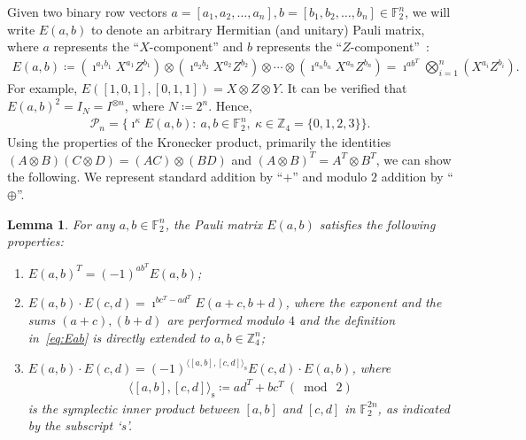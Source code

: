 \documentclass[journal,onecolumn]{IEEEtran}
\newtheorem{lemma}[theorem]{Lemma}
\newcommand{\syminn}[2]{\langle #1, #2 \rangle_{\text{s}}}
\newif\ifnotes
\newcommand{\bane}[1]{\ifnotes{{\color{dkgreen} [Bane: #1]}}\fi}
\begin{document}
Given two binary row vectors $a = [a_1,a_2,\ldots,a_n], b = [b_1,b_2,\ldots,b_n] \in \mathbb{F}_2^n$, we will write $E(a,b)$ to denote an arbitrary Hermitian (and unitary) Pauli matrix, where $a$ represents the ``$X$-component'' and $b$ represents the ``$Z$-component''~\cite{Rengaswamy-pra19}:
\begin{align}
\label{eq:Eab}
E(a,b) \coloneqq \left( \imath^{a_1 b_1} X^{a_1} Z^{b_1} \right) \otimes \left( \imath^{a_2 b_2} X^{a_2} Z^{b_2} \right) \otimes \cdots \otimes \left( \imath^{a_n b_n} X^{a_n} Z^{b_n} \right) = \imath^{ab^T} \bigotimes_{i=1}^n (X^{a_i} Z^{b_i}).
\end{align}
For example, $E([1,0,1],[0,1,1]) = X \otimes Z \otimes Y$.
It can be verified that $E(a,b)^2 = I_N = I^{\otimes n}$, where $N \coloneqq 2^n$.
Hence,
\begin{align}
\label{eq:Pauli_group}
\mathcal{P}_n = \{ \imath^\kappa E(a,b) \colon \ a,b \in \mathbb{F}_2^n, \ \kappa \in \mathbb{Z}_4 = \{0,1,2,3\} \}.
\end{align}
Using the properties of the Kronecker product, primarily the identities $(A \otimes B) (C \otimes D) = (AC) \otimes (BD)$ and $(A \otimes B)^T = A^T \otimes B^T$, we can show the following.
We represent standard addition by ``$+$'' and modulo $2$ addition by ``$\oplus$''.

\begin{lemma}
\label{lem:Eab}
For any $a,b \in \mathbb{F}_2^n$, the Pauli matrix $E(a,b)$ satisfies the following properties:
\begin{enumerate}
    
\item[(a)] $E(a,b)^T = (-1)^{ab^T} E(a,b)$;
    
\item[(b)] $E(a,b) \cdot E(c,d) = \imath^{bc^T - ad^T} E(a+c, b+d)$, where the exponent and the sums $(a+c), (b+d)$ are performed modulo $4$ and the definition in~\eqref{eq:Eab} is directly extended
 to $a,b \in \mathbb{Z}_4^n$;
    
\item[(c)] $E(a,b) \cdot E(c,d) = (-1)^{\syminn{[a,b]}{[c,d]}} E(c,d) \cdot E(a,b)$, where 
\begin{align}
\label{eq:syminn}
\syminn{[a,b]}{[c,d]} \coloneqq ad^T + bc^T \ (\bmod\ 2)
\end{align}
is the symplectic inner product between $[a,b]$ and $[c,d]$ in $\mathbb{F}_2^{2n}$, as indicated by the subscript `s'.
    
\end{enumerate}
\end{lemma}
\end{document}
